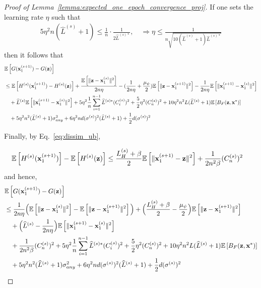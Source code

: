 \begin{proof}[Proof of Lemma~\ref{lemma:expected_one_epoch_convergence_proj}]
If one sets the learning rate $\eta$ such that
\begin{align}
    5\eta^2 n(\widehat{L}^{(s)} + 1) \leq \frac{1}{n}\cdot \frac{1}{2\widehat{L}^{(s)*}}, \quad
    \Rightarrow \eta \leq \frac{1}{n \sqrt{10 (\widehat{L}^{(s)} + 1) \widehat{L}^{(s)*}}}
\end{align}
then it follows that
\begin{align}
    &\mathbb{E}\left[G({\mathbf{x}}_1^{(s+1)}) - G({\mathbf{z}})\right]\\
    \nonumber
    &\leq \mathbb{E}\left[ H^{(s)}({\mathbf{x}}_1^{(s+1)}) - H^{(s)}({\mathbf{z}})\right]
        + \frac{\mathbb{E}\left[\|{\mathbf{z}} - {\mathbf{x}}_1^{(s)}\|^2 \right]}{2n \eta}
    - (\frac{1}{2n \eta} + \frac{\mu_\psi}{2}) \mathbb{E}\left[\|{\mathbf{z}} - {\mathbf{x}}_1^{(s+1)}\|^2\right]
        - \frac{1}{2n \eta}\mathbb{E}\left[\|{\mathbf{x}}_1^{(s+1)} - {\mathbf{x}}_1^{(s)}\|^2 \right]\\
    \nonumber
    &\quad
    + \widehat{L}^{(s)}\mathbb{E}\left[\| {\mathbf{x}}_1^{(s+1)} - {\mathbf{x}}_1^{(s)}\|^2\right]
    + 5\eta^2 \frac{1}{n}\sum_{i=1}^{n-1} \widehat{L}^{(s)*} (C_i^{(s)})^2
    + \frac{5}{2}\eta^2 (C_n^{(s)})^2
    + 10 \eta^2 n^2 L (\widehat{L}^{(s)}+1) \mathbb{E}\left[B_F({\mathbf{z}}, {\mathbf{x}}^*)\right]\\
    \nonumber
    &\quad + 5\eta^2 n^2 (\widehat{L}^{(s)} +1) \sigma_{any}^2 + 6 \eta^2 nd (\sigma^{(s)})^2 (\widehat{L}^{(s)}+1)
    + \frac{1}{2}d (\sigma^{(s)})^2
\end{align}

Finally, by Eq.~\ref{eq:dissim_ub},

\begin{align}
    \mathbb{E}\left[H^{(s)}({\mathbf{x}}_{1}^{(s+1)})\right] - \mathbb{E}\left[H^{(s)}({\mathbf{z}})\right]
    &\leq \frac{L_H^{(s)} + \beta}{2} \mathbb{E}\left[\|{\mathbf{x}}_{1}^{(s+1)} - {\mathbf{z}}\|^2\right] + \frac{1}{2n^2 \beta}(C_n^{(s)})^2
\end{align}
and hence,
\begin{align}
    &\mathbb{E}\left[G({\mathbf{x}}_1^{(s+1)}) - G({\mathbf{z}})\right]\\
    \nonumber
    &\leq \frac{1}{2n\eta}\Big(\mathbb{E}\left[\|{\mathbf{z}} - {\mathbf{x}}_1^{(s)}\|^2 \right] - \mathbb{E}\left[\| {\mathbf{z}} - {\mathbf{x}}_1^{(s+1)}\|^2 \right] \Big)
    + \Big( \frac{L_H^{(s)} + \beta}{2} - \frac{\mu_{\psi}}{2} \Big) \mathbb{E}\left[\| {\mathbf{z}} - {\mathbf{x}}_1^{(s+1)}\|^2 \right] \\
    &\quad + \Big(\widehat{L}^{(s)} - \frac{1}{2n \eta}\Big) \mathbb{E}\left[\| {\mathbf{x}}_1^{(s+1)} - {\mathbf{x}}_1^{(s)}\|^2\right]\\
    \nonumber
    &\quad
    + \frac{1}{2n^2 \beta}(C_n^{(s)})^2
    + 5\eta^2 \frac{1}{n}\sum_{i=1}^{n-1} \widehat{L}^{(s)*} (C_i^{(s)})^2
    + \frac{5}{2}\eta^2 (C_n^{(s)})^2
    + 10 \eta^2 n^2 L (\widehat{L}^{(s)} +1) \mathbb{E}\left[B_F({\mathbf{z}}, {\mathbf{x}}^*)\right]\\
    \nonumber
    &\quad + 5\eta^2 n^2 (\widehat{L}^{(s)} +1) \sigma_{any}^2 + 6 \eta^2 nd (\sigma^{(s)})^2 (\widehat{L}^{(s)}+1)
    + \frac{1}{2}d (\sigma^{(s)})^2
\end{align}


\end{proof}
